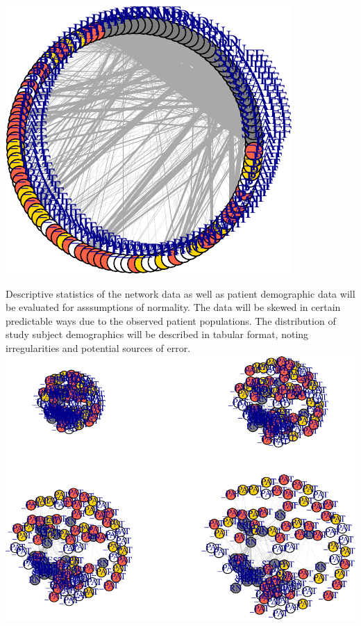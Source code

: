 \documentclass[]{elsarticle} %
\makeatletter
\def\maxwidth{\ifdim\Gin@nat@width>\linewidth\linewidth
\else\Gin@nat@width\fi}
\let\Oldincludegraphics\includegraphics
\renewcommand{\includegraphics}[1]{\Oldincludegraphics[width=\maxwidth]{#1}}
\makeatother
\begin{document}
\includegraphics{Flynn_Project_files/figure-latex/shift10 circle-1.pdf}

Descriptive statistics of the network data as well as patient
demographic data will be evaluated for asssumptions of normality. The
data will be skewed in certain predictable ways due to the observed
patient populations. The distribution of study subject demographics will
be described in tabular format, noting irregularities and potential
sources of error.
\includegraphics{Flynn_Project_files/figure-latex/Shift10 4x4-1.pdf}
\end{document}
